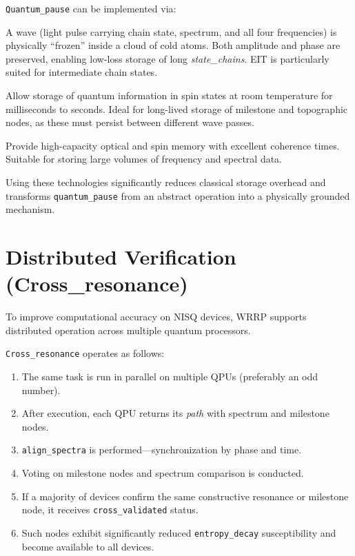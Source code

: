 \documentclass[11pt,a4paper]{article}
\begin{document}
\texttt{Quantum\_pause} can be implemented via:

\begin{description}[leftmargin=0pt, style=nextline]
    \item[Electromagnetically Induced Transparency (EIT)] A wave (light pulse carrying chain state, spectrum, and all four frequencies) is physically ``frozen'' inside a cloud of cold atoms. Both amplitude and phase are preserved, enabling low-loss storage of long \textit{state\_chains}. EIT is particularly suited for intermediate chain states.
    
    \item[NV Centers in Diamond (Nitrogen-Vacancy centers)] Allow storage of quantum information in spin states at room temperature for milliseconds to seconds. Ideal for long-lived storage of milestone and topographic nodes, as these must persist between different wave passes.
    
    \item[Rare-Earth Ion Crystals] Provide high-capacity optical and spin memory with excellent coherence times. Suitable for storing large volumes of frequency and spectral data.
\end{description}

Using these technologies significantly reduces classical storage overhead and transforms \texttt{quantum\_pause} from an abstract operation into a physically grounded mechanism.

\section{Distributed Verification (Cross\_resonance)}

To improve computational accuracy on NISQ devices, WRRP supports distributed operation across multiple quantum processors.

\texttt{Cross\_resonance} operates as follows:
\begin{enumerate}[leftmargin=*, label=\textbf{\arabic*.}]
    \item The same task is run in parallel on multiple QPUs (preferably an odd number).
    \item After execution, each QPU returns its \textit{path} with spectrum and milestone nodes.
    \item \texttt{align\_spectra} is performed---synchronization by phase and time.
    \item Voting on milestone nodes and spectrum comparison is conducted.
    \item If a majority of devices confirm the same constructive resonance or milestone node, it receives \texttt{cross\_validated} status.
    \item Such nodes exhibit significantly reduced \texttt{entropy\_decay} susceptibility and become available to all devices.
\end{enumerate}
\end{document}
